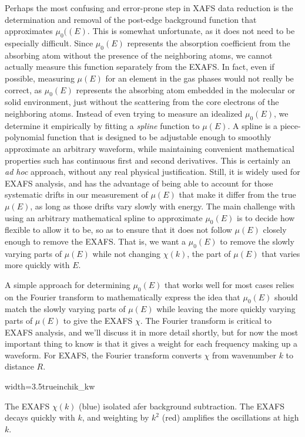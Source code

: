 Perhaps the most confusing and error-prone step in XAFS data reduction is
the determination and removal of the post-edge background function that
approximates $\mu_0((E)$. This is somewhat unfortunate, as it does not need
to be especially difficult.  Since $\mu_0(E)$ represents the absorption
coefficient from the absorbing atom without the presence of the neighboring
atoms, we cannot actually measure this function separately from the EXAFS.
In fact, even if possible, measuring $\mu(E)$ for an element in the gas
phases would not really be correct, as $\mu_0(E)$ represents the absorbing
atom embedded in the molecular or solid environment, just without the
scattering from the core electrons of the neighboring atoms.  Instead of
even trying to measure an idealized $\mu_0(E)$, we determine it empirically
by fitting a {\emph{spline}} function to $\mu(E)$.  A spline is a
piece-polynomial function that is designed to be adjustable enough to
smoothly approximate an arbitrary waveform, while maintaining convenient
mathematical properties such has continuous first and second derivatives.
This is certainly an {\emph{ad hoc}} approach, without any real physical
justification.  Still, it is widely used for EXAFS analysis, and has the
advantage of being able to account for those systematic drifts in our
measurement of $\mu(E)$ that make it differ from the true $\mu(E)$, as long
as those drifts vary slowly with energy.  The main challenge with using an
arbitrary mathematical spline to approximate $\mu_0(E)$ is to decide how
flexible to allow it to be, so as to ensure that it does not follow
$\mu(E)$ closely enough to remove the EXAFS.  That is, we want a $\mu_0(E)$
to remove the slowly varying parts of $\mu(E)$ while not changing
$\chi(k)$, the part of $\mu(E)$ that varies more quickly with $E$.


A simple approach for determining $\mu_0(E)$ that works well for most cases
relies on the Fourier transform to mathematically express the idea that
$\mu_0(E)$ should match the slowly varying parts of $\mu(E)$ while leaving
the more quickly varying parts of $\mu(E)$ to give the EXAFS $\chi$.  The
Fourier transform is critical to EXAFS analysis, and we'll discuss it in
more detail shortly, but for now the most important thing to know is that
it gives a weight for each frequency making up a waveform.  For EXAFS, the
Fourier transform converts $\chi$ from wavenumber $k$ to distance $R$.


\begin{Nfig}{width=3.5truein}{chik_kw}
  \caption{The EXAFS $\chi(k)$ (blue) isolated afer background subtraction.
    The EXAFS decays quickly with $k$, and weighting by $k^2$ (red)
    amplifies the oscillations at high $k$.}
  \label{Fig:RED:chik}
\end{Nfig}


